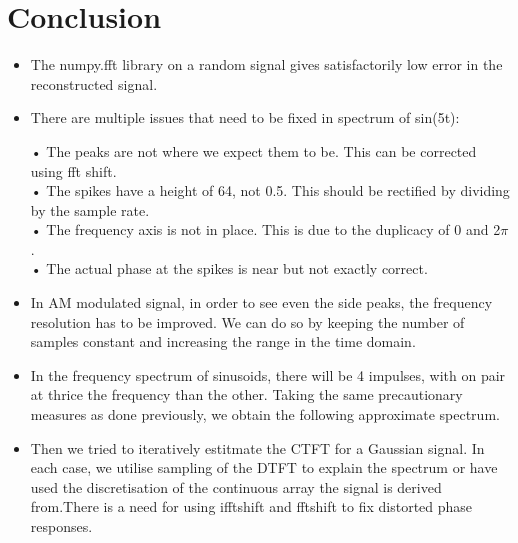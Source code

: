 \documentclass{article}
\begin{document}
\section{Conclusion}


\begin{itemize}
\item The numpy.fft library on a random signal gives satisfactorily low error in the reconstructed signal.
	
\item There are multiple issues that need to be fixed in spectrum of sin(5t):
\begin{itemize}
• The peaks are not where we expect them to be. This can be corrected
using fft shift.\\
• The spikes have a height of 64, not 0.5. This should be rectified by
dividing by the sample rate.\\
• The frequency axis is not in place. This is due to the duplicacy of 0
and 2$\pi$.\\
• The actual phase at the spikes is near but not exactly correct.
\end{itemize}

\item In AM modulated signal, in order to see even the side peaks, the frequency resolution has to be improved. We can do so by keeping the number of samples constant and increasing the range in the time domain.

\item In the frequency spectrum of sinusoids, there will be 4 impulses, with on pair
at thrice the frequency than the other. Taking the same precautionary
measures as done previously, we obtain the following approximate spectrum.

\item Then we tried to iteratively estitmate the CTFT for a Gaussian signal. In each case, we utilise sampling of the DTFT to explain the spectrum or have used the discretisation of the continuous array the signal is derived from.There is a need for using ifftshift and fftshift to fix distorted phase responses.

\end{itemize}
\end{document}
